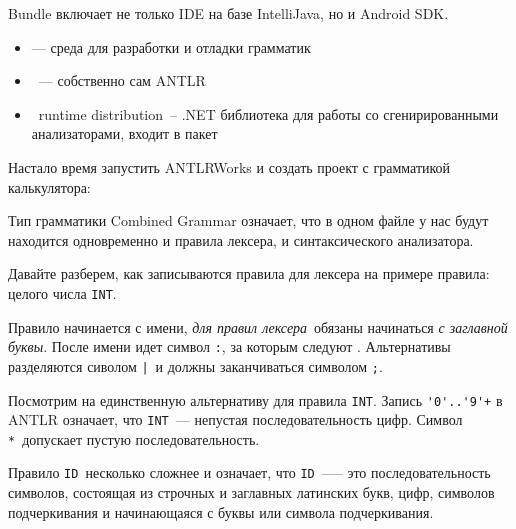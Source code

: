 
\bigskip
Bundle включает не только IDE на базе IntelliJava, но и Android SDK.

\secup


\begin{itemize}[nosep]
\item {} --- среда для разработки и отладки грамматик
\item {}\ --- собственно сам ANTLR
\item {} \cs\ runtime distribution\ -- .NET библиотека 
для работы со сгенирированными анализаторами, входит в пакет 
\end{itemize}


Настало время запустить ANTLRWorks и создать проект с грамматикой калькулятора:






Тип грамматики Combined Grammar означает, что в одном файле у нас будут 
находится одновременно и правила лексера, и синтаксического анализатора.

Давайте разберем, как записываются правила для лексера на примере правила:
целого числа \verb|INT|. 

Правило начинается с имени, \emph{для правил лексера}\ обязаны начинаться 
\emph{с заглавной буквы}. После имени идет символ \verb|:|, за которым следуют
. Альтернативы разделяются сиволом \verb$|$\ и должны 
заканчиваться символом \verb|;|.

Посмотрим на единственную альтернативу для правила \verb|INT|. 
Запись \verb|'0'..'9'+| в ANTLR означает, что \verb|INT|\ --- непустая
последовательность цифр. Символ \verb|*|\ допускает пустую последовательность.


Правило \verb|ID|\ несколько сложнее и означает, что \verb|ID|\ --— это 
последовательность символов, состоящая из строчных и заглавных латинских букв, 
цифр, символов подчеркивания и начинающаяся с буквы или символа подчеркивания.

